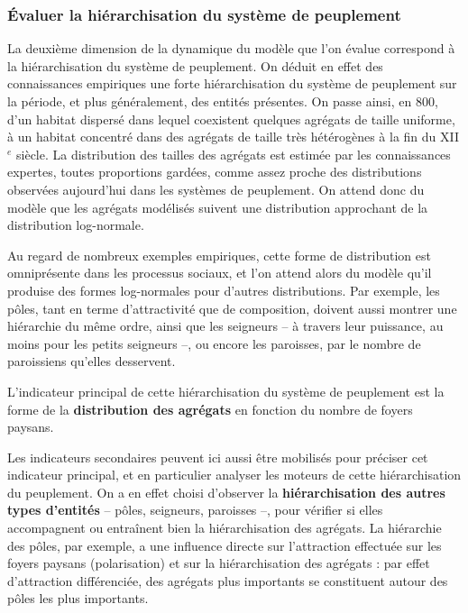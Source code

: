 \subsubsection{Évaluer la hiérarchisation du système de peuplement}

La deuxième dimension de la dynamique du modèle \simfeodal{} que l'on évalue correspond à la hiérarchisation du système de peuplement.
On déduit en effet des connaissances empiriques une forte hiérarchisation du système de peuplement sur la période, et plus généralement, des entités présentes.
On passe ainsi, en 800, d'un habitat dispersé dans lequel coexistent quelques agrégats de taille uniforme, à un habitat concentré dans des agrégats de taille très hétérogènes à la fin du XII$^e$ siècle.
La distribution des tailles des agrégats est estimée par les connaissances expertes, toutes proportions gardées, comme assez proche des distributions observées aujourd'hui dans les systèmes de peuplement.
On attend donc du modèle que les agrégats modélisés suivent une distribution approchant de la distribution log-normale.

Au regard de nombreux exemples empiriques, cette forme de distribution est omniprésente dans les processus sociaux, et l'on attend alors du modèle qu'il produise des formes log-normales pour d'autres distributions.
Par exemple, les pôles, tant en terme d'attractivité que de composition, doivent aussi montrer une hiérarchie du même ordre, ainsi que les seigneurs -- à travers leur puissance, au moins pour les petits seigneurs --, ou encore les paroisses, par le nombre de paroissiens qu'elles desservent.

L'indicateur principal de cette hiérarchisation du système de peuplement est
la forme de la \textbf{distribution des agrégats} en fonction du nombre de foyers paysans.

Les indicateurs secondaires peuvent ici aussi être mobilisés pour préciser cet indicateur principal, et en particulier analyser les moteurs de cette hiérarchisation du peuplement.
On a en effet choisi d'observer la \textbf{hiérarchisation des autres types d'entités} -- pôles, seigneurs, paroisses --, pour vérifier si elles accompagnent ou entraînent bien la hiérarchisation des agrégats.
La hiérarchie des pôles, par exemple, a une influence directe sur l'attraction effectuée sur les foyers paysans (polarisation) et sur la hiérarchisation des agrégats :
par effet d'attraction différenciée, des agrégats plus importants se constituent autour des pôles les plus importants.

